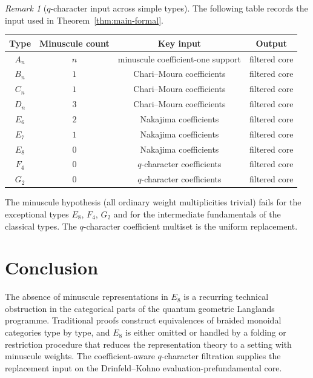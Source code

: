 \documentclass[11pt,reqno]{amsart}
\theoremstyle{definition}
\theoremstyle{remark}
\newtheorem{remark}[theorem]{Remark}
\numberwithin{equation}{section}
\begin{document}
\begin{remark}[$q$-character input across simple types]
\label{rem:cg-table}
The following table records the input used in
Theorem~\ref{thm:main-formal}.
\begin{center}
\begin{tabular}{cccc}
\toprule
Type & Minuscule count & Key input & Output \\
\midrule
$A_n$ & $n$ & minuscule coefficient-one support & filtered core \\
$B_n$ & $1$ & Chari--Moura coefficients & filtered core \\
$C_n$ & $1$ & Chari--Moura coefficients & filtered core \\
$D_n$ & $3$ & Chari--Moura coefficients & filtered core \\
$E_6$ & $2$ & Nakajima coefficients & filtered core \\
$E_7$ & $1$ & Nakajima coefficients & filtered core \\
$E_8$ & $0$ & Nakajima coefficients & filtered core \\
$F_4$ & $0$ & $q$-character coefficients & filtered core \\
$G_2$ & $0$ & $q$-character coefficients & filtered core \\
\bottomrule
\end{tabular}
\end{center}
The minuscule hypothesis (all ordinary weight multiplicities
trivial) fails for the exceptional types $E_8$, $F_4$, $G_2$ and
for the intermediate fundamentals of the classical types. The
$q$-character coefficient multiset is the uniform replacement.
\end{remark}

\section{Conclusion}
\label{sec:conclusion}

The absence of minuscule representations in $E_8$ is a recurring
technical obstruction in the categorical parts of the quantum
geometric Langlands programme. Traditional proofs construct
equivalences of braided monoidal categories type by type, and
$E_8$ is either omitted or handled by a folding or restriction
procedure that reduces the representation theory to a setting with
minuscule weights. The coefficient-aware $q$-character filtration
supplies the replacement input on the Drinfeld--Kohno
evaluation-prefundamental core.
\end{document}
